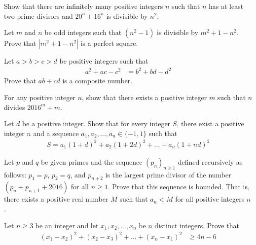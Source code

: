 \begin{problem}
	Show that there are infinitely many positive integers $n$ such that $n$ has at least two prime divisors and $20^n + 16^n$ is divisible by $n^2$.
\end{problem}

\begin{problem}
	Let $m$ and $n$ be odd integers such that $(n^2 - 1)$ is divisible by $m^2 + 1 - n^2$. Prove that $|m^2 + 1 - n^2|$ is a perfect square.
\end{problem}

\begin{problem}
	Let $a > b > c > d$ be positive integers such that
		\begin{align*}
			a^2 + ac - c^2
				& = b^2 + bd - d^2
		\end{align*}
	Prove that $ab + cd$ is a composite number.
\end{problem}

\begin{problem}
	For any positive integer $n$, show that there exists a positive integer $m$ such that $n$ divides $2016^m + m$.
\end{problem}

\begin{problem}
	Let $d$ be a positive integer. Show that for every integer $S$, there exist a positive integer $n$ and a sequence $a_1, a_2,\dots , a_n \in \{-1, 1\}$ such that
		\begin{align*}
			S = a_1(1 + d)^2 + a_2(1 + 2d)^2 + \dots + a_n(1 + nd)^2
		\end{align*}
\end{problem}

\begin{problem}
	Let $p$ and $q$ be given primes and the sequence $(p_n)_{n\geq 1}$ defined recursively as follows: $p_1 = p$, $p_2 = q$, and $p_{n+2}$ is the largest prime divisor of the number $(p_n + p_{n+1} + 2016)$ for all $n \geq 1$. Prove that this sequence is bounded. That is, there exists a positive real number $M$ such that $a_n < M$ for all positive integers $n$.
\end{problem}

\begin{problem}
	Let $n \geq 3$ be an integer and let $x_1, x_2,\dots , x_n$ be $n$ distinct integers. Prove that
		\begin{align*}
			(x_1 - x_2)^2 +(x_2 - x_3)^2 + \dots+(x_n - x_1)^2
				& \geq 4n - 6
		\end{align*}
\end{problem}

